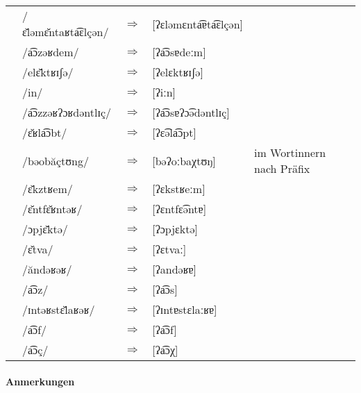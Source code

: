 \begin{longtable}[l]{p{0.1mm}lcll}
    & /ɛ̆ləmɛ̆ntaʁta͡ɛlçən/ & $\Rightarrow$ & [ʔɛləmɛnta͡ɐta͡ɛlçən] &                                   \\
    & /a͡ɔzəʁdem/         & $\Rightarrow$ & [ʔa͡ɔsɐdeːm]         &                                   \\
    & /elɛ̆ktʁɪʃə/        & $\Rightarrow$ & [ʔelɛktʁɪʃə]        &                                   \\
    & /in/               & $\Rightarrow$ & [ʔiːn]              &                                   \\
    & /a͡ɔzzəʁʔɔʁdəntlɪç/ & $\Rightarrow$ & [ʔa͡ɔsɐʔɔ͡ədəntlɪç]   &                                   \\
    & /ɛ̆ʁla͡ɔbt/          & $\Rightarrow$ & [ʔɛ͡əla͡ɔpt]          &                                   \\
    & /bəobăçtʊng/       & $\Rightarrow$ & [bəʔoːbaχtʊŋ]       & im Wortinnern nach Präfix         \\
    & /ɛ̆kztʁem/          & $\Rightarrow$ & [ʔɛkstʁeːm]         &                                   \\
    & /ɛ̆ntfɛ̆ʁntəʁ/       & $\Rightarrow$ & [ʔɛntfɛ͡əntɐ]        &                                   \\
    & /ɔpjɛ̆ktə/          & $\Rightarrow$ & [ʔɔpjɛktə]          &                                   \\
    & /ɛ̆tva/             & $\Rightarrow$ & [ʔɛtvaː]            &                                   \\
    & /ăndəʁəʁ/          & $\Rightarrow$ & [ʔandəʁɐ]           &                                   \\
    & /a͡ɔz/              & $\Rightarrow$ & [ʔa͡ɔs]              &                                   \\
    & /ɪntəʁstɛ̆laʁəʁ/    & $\Rightarrow$ & [ʔɪntɐstɛlaːʁɐ]     &                                   \\
    & /a͡ɔf/              & $\Rightarrow$ & [ʔa͡ɔf]              &                                   \\
    & /a͡ɔç/              & $\Rightarrow$ & [ʔa͡ɔχ]              &                                   \\
\end{longtable}

\paragraph*{Anmerkungen}

